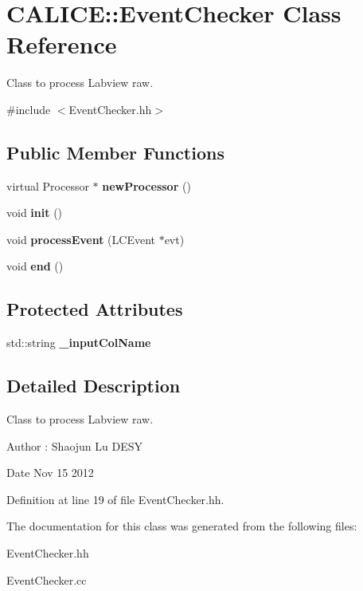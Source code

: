 \section{CALICE::EventChecker Class Reference}
\label{classCALICE_1_1EventChecker}


Class to process Labview raw.  


{\ttfamily \#include $<$EventChecker.hh$>$}\subsection*{Public Member Functions}
\begin{DoxyCompactItemize}
\item 
virtual Processor $\ast$ {\bfseries newProcessor} ()\label{classCALICE_1_1EventChecker_af20da755dd41779a95fc39934a69610d}

\item 
void {\bfseries init} ()\label{classCALICE_1_1EventChecker_ab41fa998c1d7ba6fe042e431578cb8e9}

\item 
void {\bfseries processEvent} (LCEvent $\ast$evt)\label{classCALICE_1_1EventChecker_a6419a5663a9eb46524bd9b8401d812e4}

\item 
void {\bfseries end} ()\label{classCALICE_1_1EventChecker_a34dd62a9bdd384b2a5bb9fc59b3634d5}

\end{DoxyCompactItemize}
\subsection*{Protected Attributes}
\begin{DoxyCompactItemize}
\item 
std::string {\bfseries \_\-inputColName}\label{classCALICE_1_1EventChecker_a94fd86833f389b2eaf23cce14baef4bb}

\end{DoxyCompactItemize}


\subsection{Detailed Description}
Class to process Labview raw. \begin{DoxyAuthor}{Author}
: Shaojun Lu DESY 
\end{DoxyAuthor}
\begin{DoxyDate}{Date}
Nov 15 2012 
\end{DoxyDate}


Definition at line 19 of file EventChecker.hh.

The documentation for this class was generated from the following files:\begin{DoxyCompactItemize}
\item 
EventChecker.hh\item 
EventChecker.cc\end{DoxyCompactItemize}
